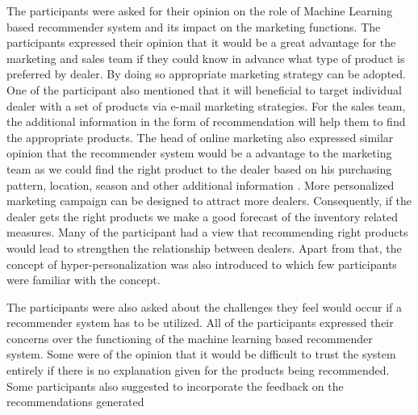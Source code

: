\par
The participants were asked for their opinion on the role of Machine Learning based recommender system and its impact on the marketing functions. The participants expressed their opinion that it would be a great advantage for the marketing and sales team if they could know in advance what type of product is preferred by dealer. By doing so appropriate marketing strategy can be adopted. One of the participant also mentioned that it will beneficial to target individual dealer with a set of products via e-mail marketing strategies. For the sales team, the additional information in the form of recommendation will help them to find the appropriate products. The head of online marketing also expressed similar opinion that the recommender system would be a advantage to the marketing team as we could find the right product to the dealer based on his purchasing pattern, location, season and other additional information
. More personalized marketing campaign can be designed to attract more dealers. Consequently, if the dealer gets the right products we make a good forecast of the inventory related measures. Many of the participant had a view that recommending right products would lead to strengthen the relationship between dealers. Apart from that, the concept of hyper-personalization was also introduced to which few participants were familiar with the concept.
\\
\par
The participants were also asked about the challenges they feel would occur if a recommender system has to be utilized. All of the participants expressed their concerns over the functioning of the machine learning based recommender system. Some were of the opinion that it would be difficult to trust the system entirely if there is no explanation given for the products being recommended. Some participants also suggested to incorporate the feedback on the recommendations generated



